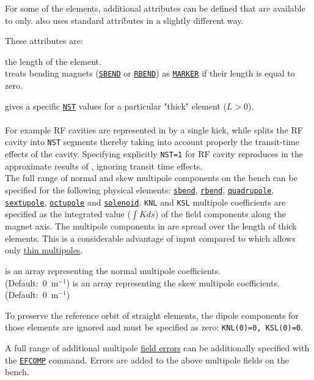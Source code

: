 For some of the \madx elements, additional attributes can be defined
that are available to \ptc only. \ptc also uses standard \madx
attributes in a slightly different way.


These attributes are:
\begin{madlist}
   the length of the element. \\ \ptc treats bending magnets
  (\hyperref[sec:bend]{\texttt{SBEND}} or \hyperref[sec:bend]{\texttt{RBEND}})
  as \hyperref[sec:marker]{\texttt{MARKER}} if their length is equal to zero.

   gives a specific \hyperref[sec:ptc-twiss]{\texttt{NST}}
  values for a particular "thick" element ($L > 0$). \\
  \\
  For example RF cavities are represented in \madx
  by a single kick, while \ptc splits the RF cavity into
  \texttt{NST} segments thereby taking into account properly the
  transit-time effects of the cavity. Specifying explicitly \texttt{NST=1}
  for RF cavity reproduces in \ptc the approximate results of \madx,
  ignoring transit time effects.
  \\

   The full range of  normal and skew multipole
  components on the bench can be  specified for the following physical
  elements:
  \hyperref[sec:bend]{\texttt{sbend}},
  \hyperref[sec:bend]{\texttt{rbend}},
  \hyperref[sec:quadrupole]{\texttt{quadrupole}},
  \hyperref[sec:sextupole]{\texttt{sextupole}},
  \hyperref[sec:octupole]{\texttt{octupole}} and
  \hyperref[sec:solenoid]{\texttt{solenoid}}.
  \texttt{KNL} and \texttt{KSL} multipole coefficients are specified as the
  integrated value ($\int K ds$) of the field components along the
  magnet axis. The multipole components in \ptc are spread over
  the length of thick elements. This is a considerable
  advantage of \ptc input compared  to \madx  which allows only
  \hyperref[sec:multipole]{thin multipoles}.
  \begin{madlist}
     is an array representing the normal multipole
    coefficients. \\ (Default:~0~m$^{-1}$)
     is an array representing the skew multipole
    coefficients. \\ (Default:~0~m$^{-1}$)
  \end{madlist}
  To preserve the reference orbit of straight elements, the dipole
  components for those elements are ignored and must be specified as
  zero: \texttt{KNL(0)=0, KSL(0)=0}.

  A full range of additional multipole \hyperref[sec:efcomp]{field
    errors} can be additionally specified with the
  \hyperref[sec:efcomp]{\texttt{EFCOMP}} command. Errors are added to
  the above multipole fields on the bench.

\end{madlist}

